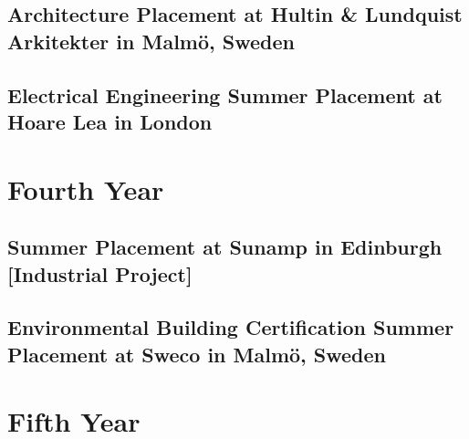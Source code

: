 
\subsection{Architecture Placement at Hultin \& Lundquist Arkitekter in Malmö, Sweden}




\subsection{Electrical Engineering Summer Placement at Hoare Lea in London}




\section{Fourth Year}



\subsection{Summer Placement at Sunamp in Edinburgh [Industrial Project]}



\subsection{Environmental Building Certification Summer Placement at Sweco in Malmö, Sweden}




\section{Fifth Year}



